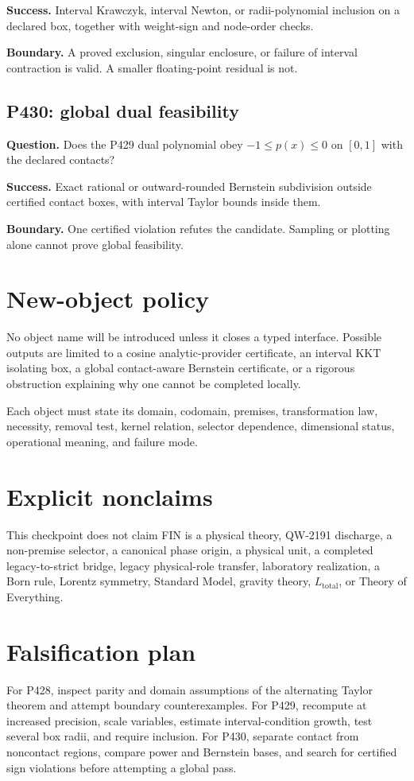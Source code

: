 \documentclass[11pt,a4paper]{article}
\begin{document}
\textbf{Success.} Interval Krawczyk, interval Newton, or radii-polynomial
inclusion on a declared box, together with weight-sign and node-order checks.

\textbf{Boundary.} A proved exclusion, singular enclosure, or failure of
interval contraction is valid. A smaller floating-point residual is not.

\subsection{P430: global dual feasibility}
\textbf{Question.} Does the P429 dual polynomial obey $-1\le p(x)\le0$ on
$[0,1]$ with the declared contacts?

\textbf{Success.} Exact rational or outward-rounded Bernstein subdivision
outside certified contact boxes, with interval Taylor bounds inside them.

\textbf{Boundary.} One certified violation refutes the candidate. Sampling or
plotting alone cannot prove global feasibility.

\section{New-object policy}
No object name will be introduced unless it closes a typed interface. Possible
outputs are limited to a cosine analytic-provider certificate, an interval KKT
isolating box, a global contact-aware Bernstein certificate, or a rigorous
obstruction explaining why one cannot be completed locally.

Each object must state its domain, codomain, premises, transformation law,
necessity, removal test, kernel relation, selector dependence, dimensional
status, operational meaning, and failure mode.

\section{Explicit nonclaims}
This checkpoint does not claim FIN is a physical theory, QW-2191 discharge,
a non-premise selector, a canonical phase origin, a physical unit, a completed
legacy-to-strict bridge, legacy physical-role transfer, laboratory realization,
a Born rule, Lorentz symmetry, Standard Model, gravity theory,
$L_{\mathrm{total}}$, or Theory of Everything.

\section{Falsification plan}
For P428, inspect parity and domain assumptions of the alternating Taylor
theorem and attempt boundary counterexamples. For P429, recompute at increased
precision, scale variables, estimate interval-condition growth, test several
box radii, and require inclusion. For P430, separate contact from noncontact
regions, compare power and Bernstein bases, and search for certified sign
violations before attempting a global pass.
\end{document}
